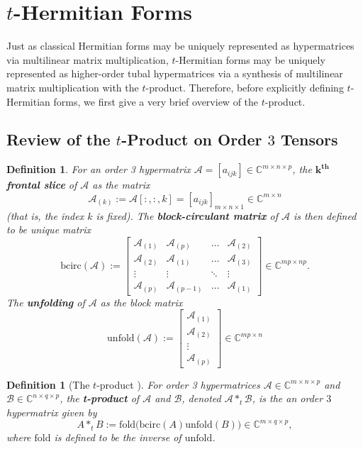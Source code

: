 \documentclass[11pt]{article}
\newtheorem{defn}[theorem]{Definition}
\begin{document}
\section{$t$-Hermitian Forms}\label{$t$-Hermitian Forms}
Just as classical Hermitian forms may be uniquely represented as hypermatrices via multilinear matrix multiplication, $t$-Hermitian forms may be uniquely represented as higher-order tubal hypermatrices via a synthesis of multilinear matrix multiplication with the $t$-product. Therefore, before explicitly defining $t$-Hermitian forms, we first give a very brief overview of the $t$-product. 
\subsection{Review of the $t$-Product on Order $3$ Tensors}
\begin{defn}
    For an order 3 hypermatrix $\mathcal{A} = [a_{ijk}]\in \mathbb{C}^{m\times n\times p}$, the \textbf{$\boldsymbol{k^{th}}$ frontal slice} of $\mathcal{A}$ as the matrix 
    \[\mathcal{A}_{(k)} := \mathcal{A}[:,:,k] = [a_{ijk}]_{m\times n\times 1}\in \mathbb{C}^{m\times n}\]
    (that is, the index $k$ is fixed). The \textbf{block-circulant matrix} of $\mathcal{A}$ is then defined to be unique matrix 
    \[\mathrm{bcirc}(\mathcal{A}) := \left[\begin{array}{cccc}
        \mathcal{A}_{(1)} & \mathcal{A}_{(p)} & \dots & \mathcal{A}_{(2)} \\
        \mathcal{A}_{(2)} & \mathcal{A}_{(1)} & \dots & \mathcal{A}_{(3)} \\
        \vdots & \vdots & \ddots & \vdots \\
        \mathcal{A}_{(p)} & \mathcal{A}_{(p-1)} & \dots & \mathcal{A}_{(1)}
    \end{array}\right]\in \mathbb{C}^{mp\times np}.\]
    The \textbf{unfolding} of $\mathcal{A}$ as the block matrix 
    \[\mathrm{unfold}(\mathcal{A}) := \left[\begin{array}{c}
        \mathcal{A}_{(1)} \\
        \mathcal{A}_{(2)} \\
        \vdots \\
        \mathcal{A}_{(p)}
    \end{array}\right]\in \mathbb{C}^{mp\times n}\]
\end{defn}
\begin{defn}[The $t$-product \cite{kilmer2000third}]
    For order 3 hypermatrices $\mathcal{A}\in \mathbb{C}^{m\times n\times p}$ and $\mathcal{B}\in \mathbb{C}^{n\times q\times p}$, the \textbf{t-product} of $\mathcal{A}$ and $\mathcal{B}$, denoted $\mathcal{A}*_t\mathcal{B}$, is the an order $3$ hypermatrix given by 
    \[A*_tB := \mathrm{fold}\big(\mathrm{bcirc}(A)\mathrm{unfold}(B)\big)\in \mathbb{C}^{m\times q\times p},\]
    where $\mathrm{fold}$ is defined to be the inverse of $\mathrm{unfold}$. 
\end{defn}
\end{document}
